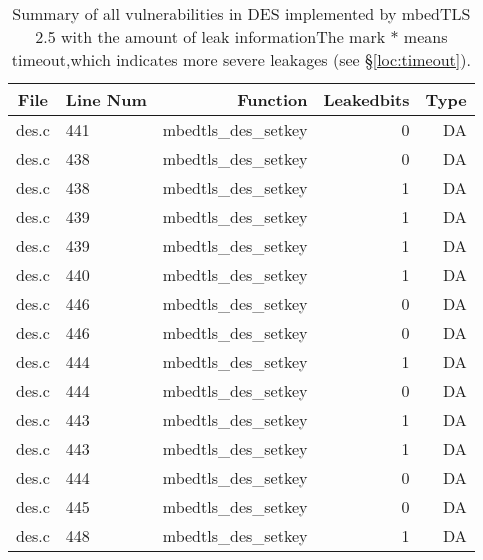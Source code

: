 \begin{table*}%
\centering
\caption{Summary of all vulnerabilities in DES implemented by mbedTLS 2.5 with the amount of leak informationThe mark $*$ means timeout,which indicates more severe leakages (see \S\ref{loc:timeout}).}\label{tab:DESmbedTLS}
\begin{tabular}{clrrr}
\hline
\textbf{File} & \textbf{Line Num} & \textbf{Function} & \textbf{Leakedbits} & \textbf{Type} \\\hline
des.c&441&mbedtls\_des\_setkey&0 &DA\\
des.c&438&mbedtls\_des\_setkey&0 &DA\\
des.c&438&mbedtls\_des\_setkey&1 &DA\\
des.c&439&mbedtls\_des\_setkey&1 &DA\\
des.c&439&mbedtls\_des\_setkey&1 &DA\\
des.c&440&mbedtls\_des\_setkey&1 &DA\\
des.c&446&mbedtls\_des\_setkey&0 &DA\\
des.c&446&mbedtls\_des\_setkey&0 &DA\\
des.c&444&mbedtls\_des\_setkey&1 &DA\\
des.c&444&mbedtls\_des\_setkey&0 &DA\\
des.c&443&mbedtls\_des\_setkey&1 &DA\\
des.c&443&mbedtls\_des\_setkey&1 &DA\\
des.c&444&mbedtls\_des\_setkey&0 &DA\\
des.c&445&mbedtls\_des\_setkey&0 &DA\\
des.c&448&mbedtls\_des\_setkey&1 &DA\\
\hline
\end{tabular}
\end{table*}